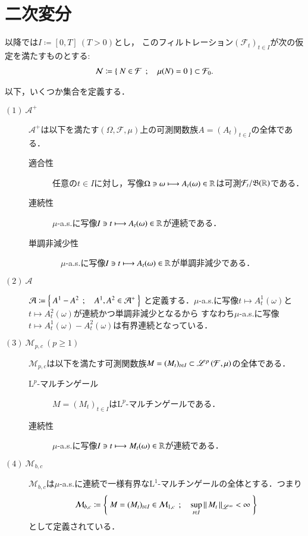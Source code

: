 \section{二次変分}
	以降では$I \coloneqq [0,T]\ (T>0)$とし，
	このフィルトレーション$(\mathcal{F}_t)_{t \in I}$が次の仮定を満たすものとする:
	\begin{align}
		\mathcal{N} \coloneqq \left\{\ N \in \mathcal{F}\ \, ; \quad \mu(N) = 0\ \right\}
		\subset \mathcal{F}_0.
	\end{align}
	
	以下，いくつか集合を定義する．
	\begin{description}
		\item[$\mathrm{(1)}\ \mathcal{A}^+$] 
			$\mathcal{A}^+$は以下を満たす$(\Omega,\mathcal{F},\mu)$上の可測関数族$A = (A_t)_{t \in I}$の全体である．
			\begin{description}
				\item[適合性] 任意の$t \in I$に対し，写像$\Omega \ni \omega \longmapsto A_t(\omega) \in \mathbb{R}$は可測$\mathcal{F}_t/\mathfrak{B}(\mathbb{R})$である．
				\item[連続性] $\mu$-a.s.に写像$I \ni t \longmapsto A_t(\omega) \in \mathbb{R}$が連続である．
				\item[単調非減少性]　$\mu$-a.s.に写像$I \ni t \longmapsto A_t(\omega) \in \mathbb{R}$が単調非減少である．
			\end{description}
		
		\item[$\mathrm{(2)}\ \mathcal{A}$]
			$\mathcal{A} \coloneqq \left\{\ A^1 - A^2\ \, ; \quad A^1,A^2 \in \mathcal{A}^+\ \right\}$
			と定義する．$\mu$-a.s.に写像$t \longmapsto A^1_t(\omega)$と$t \longmapsto A^2_t(\omega)$が連続かつ単調非減少となるから
			すなわち$\mu$-a.s.に写像$t \longmapsto A^1_t(\omega) - A^2_t(\omega)$は有界連続となっている．
			
		\item[$\mathrm{(3)}\ \mathcal{M}_{p,c}\ (p \geq 1)$]
			$\mathcal{M}_{p,c}$は以下を満たす可測関数族$M = (M_t)_{t \in I} \subset \mathscr{L}^{p} \left(\mathcal{F},\mu\right)$の全体である．
			\begin{description}
				\item[$\mathrm{L}^p$-マルチンゲール] $M = (M_t)_{t \in I}$は$\mathrm{L}^p$-マルチンゲールである．
				\item[連続性] $\mu$-a.s.に写像$I \ni t \longmapsto M_t(\omega) \in \mathbb{R}$が連続である．
			\end{description}
		
		\item[$\mathrm{(4)}\ \mathcal{M}_{b,c}$]
			$\mathcal{M}_{b,c}$は$\mu$-a.s.に連続で一様有界な$\mathrm{L}^1$-マルチンゲールの全体とする．つまり
			\begin{align}
				\mathcal{M}_{b,c} \coloneqq \left\{\ M = (M_t)_{t \in I} \in \mathcal{M}_{1,c}\ \, ; \quad \operatorname*{sup}_{t \in I} \left\|\, M_t\, \right\|_{\mathscr{L}^\infty} < \infty\ \right\}
			\end{align}
			として定義されている．
			

\end{description}
